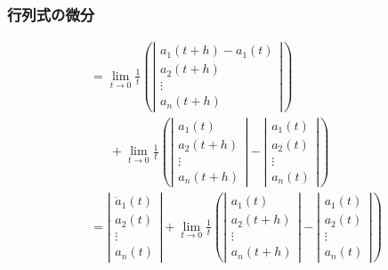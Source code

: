 \documentclass[10pt,usepdftitle=false,hyperref={unicode}]{beamer}
\newcommand{\absolute}[1]{\left|#1\right|}
\newcommand{\parentheses}[1]{\left(#1\right)}
\begin{document}
\begin{frame}
\frametitle{行列式の微分}
\begin{align*}
    &= \lim_{t \to 0}\frac{1}{t}
    \parentheses{%
        \absolute{%
            \begin{array}{c}
                a_1\parentheses{t + h} - a_1\parentheses{t} \\
                a_2\parentheses{t + h} \\
                \vdots \\
                a_n\parentheses{t + h}
            \end{array}
        }
    } \\
    &\phantom{=}\ + \lim_{t \to 0}\frac{1}{t}
    \parentheses{%
        \absolute{%
            \begin{array}{c}
                a_1\parentheses{t} \\
                a_2\parentheses{t + h} \\
                \vdots \\
                a_n\parentheses{t + h}
            \end{array}
        }
        -
        \absolute{%
            \begin{array}{c}
                a_1\parentheses{t} \\
                a_2\parentheses{t} \\
                \vdots \\
                a_n\parentheses{t}
            \end{array}
        }
    } \\
    &= \absolute{%
            \begin{array}{c}
                \dot{a}_1\parentheses{t} \\
                a_2\parentheses{t} \\
                \vdots \\
                a_n\parentheses{t}
            \end{array}
    } + \lim_{t \to 0}\frac{1}{t}
    \parentheses{%
        \absolute{%
            \begin{array}{c}
                a_1\parentheses{t} \\
                a_2\parentheses{t + h} \\
                \vdots \\
                a_n\parentheses{t + h}
            \end{array}
        }
        -
        \absolute{%
            \begin{array}{c}
                a_1\parentheses{t} \\
                a_2\parentheses{t} \\
                \vdots \\
                a_n\parentheses{t}
            \end{array}
        }
    }
\end{align*}
\end{frame}
\end{document}
